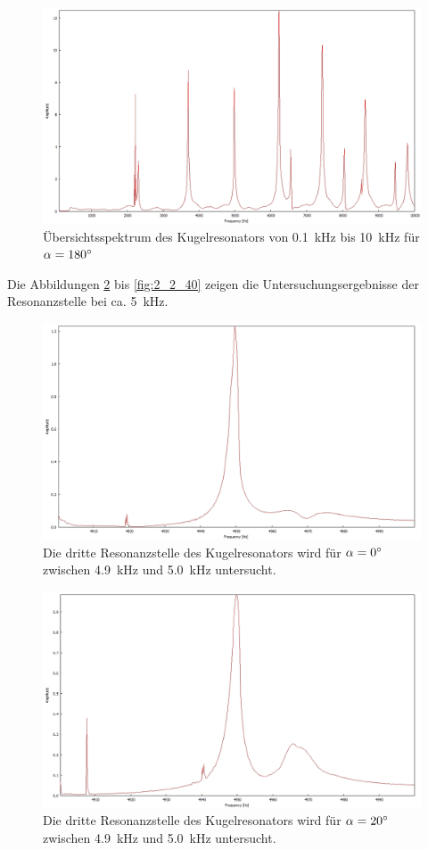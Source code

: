 \begin{figure}
\includegraphics[width=\textwidth]{content/messungen/Chapter2new/2_1_180img.jpg}
\caption{Übersichtsspektrum des Kugelresonators von 0.1~kHz bis 10~kHz für $\alpha=180\degree$}
\label{fig:2_1_180}
\end{figure}
Die Abbildungen \ref{fig:2_2_0} bis \ref{fig:2_2_40} zeigen die Untersuchungsergebnisse der Resonanzstelle bei ca. 5~kHz. 
\begin{figure}
\centering
\includegraphics[width=\textwidth]{content/messungen/Chapter2new/2_2_0img.jpg}
\caption{Die dritte Resonanzstelle des Kugelresonators wird für $\alpha=0\degree$ zwischen 4.9~kHz und 5.0~kHz untersucht.}
\label{fig:2_2_0}
\end{figure}
\begin{figure}
\centering
\includegraphics[width=\textwidth]{content/messungen/Chapter2new/2_2_20mg.jpg}
\caption{Die dritte Resonanzstelle des Kugelresonators wird für $\alpha=20\degree$ zwischen 4.9~kHz und 5.0~kHz untersucht.}
\label{fig:2_2_20}
\end{figure}
